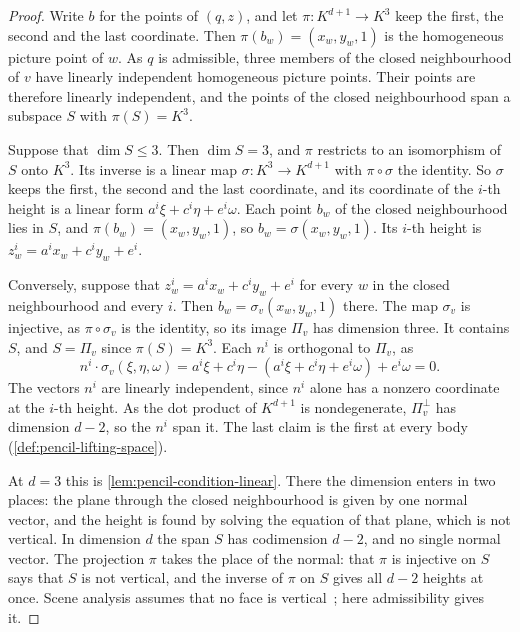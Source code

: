 \begin{proof}
  \leanok
  Write $b$ for the points of $(q, z)$, and let
  $\pi \colon K^{d+1} \to K^3$ keep the first, the second and the last
  coordinate. Then $\pi(b_w) = (x_w, y_w, 1)$ is the homogeneous picture
  point of $w$. As $q$ is admissible, three members of the closed
  neighbourhood of $v$ have linearly independent homogeneous picture
  points. Their points are therefore linearly independent, and the points
  of the closed neighbourhood span a subspace $S$ with $\pi(S) = K^3$.

  Suppose that $\dim S \le 3$. Then $\dim S = 3$, and $\pi$ restricts to
  an isomorphism of $S$ onto $K^3$. Its inverse is a linear map
  $\sigma \colon K^3 \to K^{d+1}$ with $\pi \circ \sigma$ the identity.
  So $\sigma$ keeps the first, the second and the last coordinate, and its
  coordinate of the $i$-th height is a linear form
  $a^i \xi + c^i \eta + e^i \omega$. Each point $b_w$ of the closed
  neighbourhood lies in $S$, and $\pi(b_w) = (x_w, y_w, 1)$, so
  $b_w = \sigma(x_w, y_w, 1)$. Its $i$-th height is
  $z^i_w = a^i x_w + c^i y_w + e^i$.

  Conversely, suppose that $z^i_w = a^i x_w + c^i y_w + e^i$ for every
  $w$ in the closed neighbourhood and every $i$. Then
  $b_w = \sigma_v(x_w, y_w, 1)$ there. The map $\sigma_v$ is injective,
  as $\pi \circ \sigma_v$ is the identity, so its image $\Pi_v$ has
  dimension three. It contains $S$, and $S = \Pi_v$ since
  $\pi(S) = K^3$. Each $n^i$ is orthogonal to $\Pi_v$, as
  \[
    n^i \cdot \sigma_v(\xi, \eta, \omega) = a^i \xi + c^i \eta
    - (a^i \xi + c^i \eta + e^i \omega) + e^i \omega = 0.
  \]
  The vectors $n^i$ are linearly independent, since $n^i$ alone has a
  nonzero coordinate at the $i$-th height. As the dot product of
  $K^{d+1}$ is nondegenerate, $\Pi_v^{\perp}$ has dimension $d - 2$, so
  the $n^i$ span it. The last claim is the first at every body
  (\cref{def:pencil-lifting-space}).

  At $d = 3$ this is \cref{lem:pencil-condition-linear}. There the
  dimension enters in two places: the plane through the closed
  neighbourhood is given by one normal vector, and the height is found by
  solving the equation of that plane, which is not vertical. In
  dimension $d$ the span $S$ has codimension $d - 2$, and no single
  normal vector. The projection $\pi$ takes the place of the normal:
  that $\pi$ is injective on $S$ says that $S$ is not vertical, and the
  inverse of $\pi$ on $S$ gives all $d - 2$ heights at once. Scene
  analysis assumes that no face is vertical~\cite[p.~271]{whiteley1984};
  here admissibility gives it.
\end{proof}

